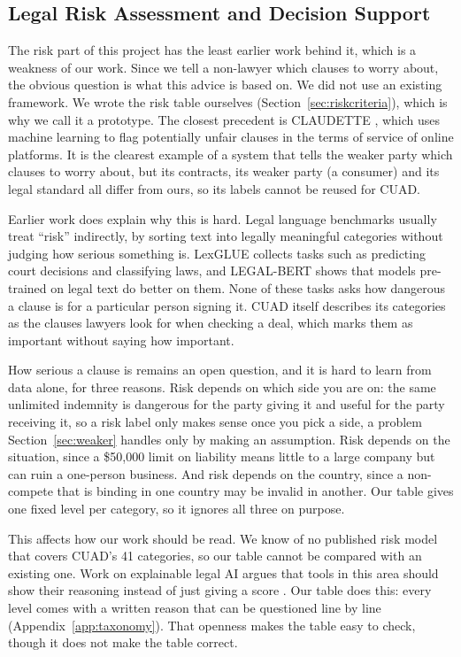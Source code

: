 \subsection{Legal Risk Assessment and Decision Support}
\label{sec:lit_risk}
The risk part of this project has the least earlier work behind it, which is a weakness of our work. Since we tell a non-lawyer which clauses to worry about, the obvious question is what this advice is based on. We did not use an existing framework. We wrote the risk table ourselves (Section~\ref{sec:riskcriteria}), which is why we call it a prototype. The closest precedent is CLAUDETTE \cite{lippi2019claudette}, which uses machine learning to flag potentially unfair clauses in the terms of service of online platforms. It is the clearest example of a system that tells the weaker party which clauses to worry about, but its contracts, its weaker party (a consumer) and its legal standard all differ from ours, so its labels cannot be reused for CUAD.

Earlier work does explain why this is hard. Legal language benchmarks usually treat ``risk'' indirectly, by sorting text into legally meaningful categories without judging how serious something is. LexGLUE \cite{chalkidis2022lexglue} collects tasks such as predicting court decisions and classifying laws, and LEGAL-BERT \cite{chalkidis2020legalbert} shows that models pre-trained on legal text do better on them. None of these tasks asks how dangerous a clause is for a particular person signing it. CUAD itself \cite{hendrycks2021cuad} describes its categories as the clauses lawyers look for when checking a deal, which marks them as important without saying how important.

How serious a clause is remains an open question, and it is hard to learn from data alone, for three reasons. Risk depends on which side you are on: the same unlimited indemnity is dangerous for the party giving it and useful for the party receiving it, so a risk label only makes sense once you pick a side, a problem Section~\ref{sec:weaker} handles only by making an assumption. Risk depends on the situation, since a \$50{,}000 limit on liability means little to a large company but can ruin a one-person business. And risk depends on the country, since a non-compete that is binding in one country may be invalid in another. Our table gives one fixed level per category, so it ignores all three on purpose.

This affects how our work should be read. We know of no published risk model that covers CUAD's 41 categories, so our table cannot be compared with an existing one. Work on explainable legal AI argues that tools in this area should show their reasoning instead of just giving a score \cite{atkinson2020explanation}. Our table does this: every level comes with a written reason that can be questioned line by line (Appendix~\ref{app:taxonomy}). That openness makes the table easy to check, though it does not make the table correct.
